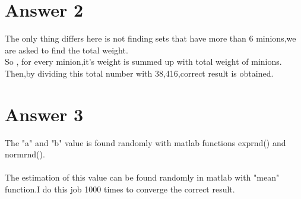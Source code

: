 \documentclass[12pt]{article}
\begin{document}
\section*{Answer 2}

The only thing differs here is not finding sets that have more than 6 minions,we are asked to find the total weight.\\
So , for every minion,it's weight is summed up with total weight of minions.\\
Then,by dividing this total number with 38,416,correct result is obtained.\\

\section*{Answer 3}
The "a" and "b" value is found randomly with matlab functions exprnd() and normrnd().\\\\
The estimation of this value can be found randomly in matlab with "mean" function.I do this job 1000 times to converge the correct result.\\
\end{document}
